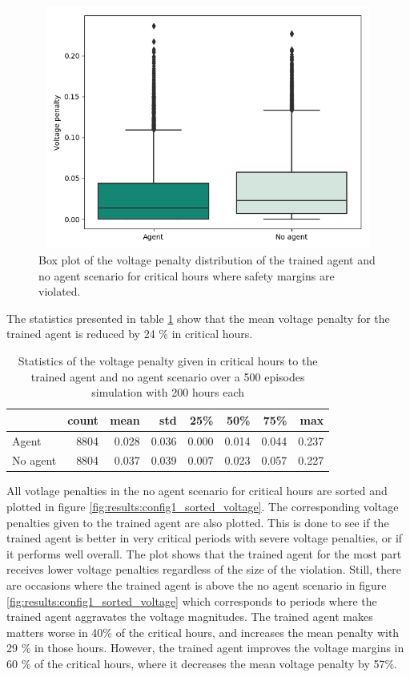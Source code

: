 \documentclass[class=book, crop=false, 11pt]{standalone}
\begin{document}
\begin{figure}[H]
    \center
\includegraphics[height=8cm, width=12cm]{figures/config1_voltage_boxplot.png}
    \caption[size = 9]{Box plot of the voltage penalty distribution of the trained agent and no agent scenario for critical hours where safety margins are violated.}
    \label{fig:results:config1_voltage_boxplot}
\end{figure}

The statistics presented in table \ref{table:results:configuration1_reward_500_ep_preventive} show that the mean voltage penalty for the trained agent is reduced by 24 \% in critical hours.


\begin{table}[h]
\center
\caption{Statistics of the voltage penalty given in critical hours to the trained agent and no agent scenario over a 500 episodes simulation with 200 hours each}
\begin{tabular}{l|rrrrrrr}
         & count    & mean  & std   & 25\%  & 50\%  & 75\%  & max   \\
\hline
Agent    & 8804 & 0.028 & 0.036 & 0.000 & 0.014 & 0.044 & 0.237 \\
No agent & 8804 & 0.037 & 0.039 & 0.007 & 0.023 & 0.057 & 0.227 \\
\hline
\end{tabular}
\label{table:results:configuration1_reward_500_ep_preventive}
\end{table}



All votlage penalties in the no agent scenario for critical hours are sorted and plotted in figure \ref{fig:results:config1_sorted_voltage}. The corresponding voltage penalties given to the trained agent are also plotted. This is done to see if the trained agent is better in very critical periods with severe voltage penalties, or if it performs well overall. The plot shows that the trained agent for the most part receives lower voltage penalties regardless of the size of the violation. Still, there are occasions where the trained agent is above the no agent scenario in figure \ref{fig:results:config1_sorted_voltage} which corresponds to periods where the trained agent aggravates the voltage magnitudes. The trained agent makes matters worse in 40\% of the critical hours, and increases the mean penalty with 29 \% in those hours. However, the trained agent improves the voltage margins in 60 \% of the critical hours, where it decreases the mean voltage penalty by 57\%.
\end{document}
